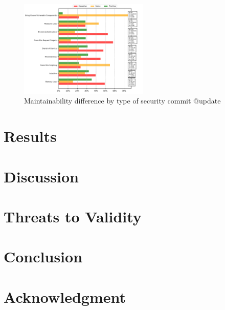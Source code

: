 \documentclass[10pt,conference]{IEEEtran}
\begin{document}
\begin{figure}[h]
 	\centering
 	\includegraphics[width=0.55\textwidth]{figures/category.pdf}
 	\caption{Maintainability difference by type of security commit \textcolor{mypink3}{@update}}
\end{figure}


\cite{Wang:2008:DSJ:1330017.1330021}


\section{Results}




\section{Discussion}


\section{Threats to Validity}


\section{Conclusion}



\section*{Acknowledgment}

{
 
  
}
\end{document}
